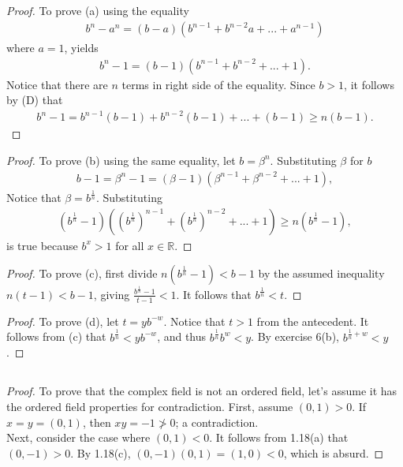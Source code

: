 \documentclass[12pt]{article}
\begin{document}
\subsection{}
\begin{proof}
				To prove (a) using the equality
				\begin{gather*}
								b^n-a^n=(b-a)(b^{n-1}+b^{n-2}a+...+a^{n-1})
				\end{gather*}
				where $a=1$, yields
				\begin{gather*}
								b^n-1=(b-1)(b^{n-1}+b^{n-2}+...+1).
				\end{gather*}
				Notice that there are $n$ terms in right side of the equality. Since $b>1$, 
				it follows by (D) that
				\begin{gather*}
								b^n-1=b^{n-1}(b-1)+b^{n-2}(b-1)+...+(b-1)\geq n(b-1).
				\end{gather*}
\end{proof}
\begin{proof}
				To prove (b) using the same equality, let $b=\beta^n$. 
				Substituting $\beta$ for $b$
				\begin{gather*}
								b-1=\beta^n-1=(\beta-1)(\beta^{n-1}+\beta^{n-2}+...+1),
				\end{gather*}
				Notice that $\beta = b^{\frac{1}{n}}$. Substituting
				\begin{gather*}
								(b^\frac{1}{n}-1)((b^\frac{1}{n})^{n-1}+(b^\frac{1}{n})^{n-2}+...+1)\geq
								n(b^\frac{1}{n}-1),
				\end{gather*}
				is true because $b^x>1$ for all $x\in\mathbb{R}$.
\end{proof}
\begin{proof}
				To prove (c), first divide $n(b^\frac{1}{n}-1)<b-1$ by the assumed inequality $n(t-1)<b-1$,
				giving $\frac{b^\frac{1}{n}-1}{t-1}<1$. It follows that $b^\frac{1}{n}<t$.
\end{proof}
\begin{proof}
				To prove (d), let $t=yb^{-w}$. Notice that $t>1$ from the antecedent. It follows from (c)
				that $b^\frac{1}{n}<yb^{-w}$, and thus $b^\frac{1}{n}b^w<y$. By exercise 6(b),
				$b^{\frac{1}{n}+w}<y$.
\end{proof}

\subsection{}
\begin{proof}
				To prove that the complex field is not an ordered field, let's assume it has the ordered
				field properties for contradiction. First, assume $(0,1)>0$. If $x=y=(0,1)$, then
				$xy=-1\ngtr0$; a contradiction.\\
				Next, consider the case where $(0,1)<0$. It follows from 1.18(a) that $(0,-1)>0$.
				By 1.18(c), $(0,-1)(0,1)=(1,0)<0$, which is absurd.
\end{proof}
\end{document}
